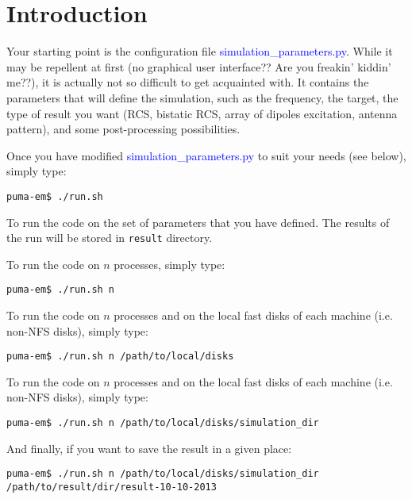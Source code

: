 \documentclass[a4paper,10pt]{book}
\newcommand{\file}[1] {\textcolor{blue}{\textsf{#1}}}
\begin{document}
\section{Introduction}
%
\par
Your starting point is the configuration file \file{simulation\_parameters.py}. While it may be repellent at first (no graphical user interface?? Are you freakin' kiddin' me??), it is actually not so difficult to get acquainted with. It contains the parameters that will define the simulation, such as the frequency, the target, the type of result you want (RCS, bistatic RCS, array of dipoles excitation, antenna pattern), and some post-processing possibilities. 
%
\par
Once you have modified \file{simulation\_parameters.py} to suit your needs (see below), simply type:
\begin{verbatim}
puma-em$ ./run.sh
\end{verbatim}
To run the code on the set of parameters that you have defined. The results of the run will be stored in \texttt{result} directory.
%
\par
To run the code on $n$ processes, simply type:
\begin{verbatim}
puma-em$ ./run.sh n
\end{verbatim}
%
\par
To run the code on $n$ processes and on the local fast disks of each machine (i.e. non-NFS disks), simply type:
\begin{verbatim}
puma-em$ ./run.sh n /path/to/local/disks
\end{verbatim}
%
\par
To run the code on $n$ processes and on the local fast disks of each machine (i.e. non-NFS disks), simply type:
\begin{verbatim}
puma-em$ ./run.sh n /path/to/local/disks/simulation_dir
\end{verbatim}
%
\par
And finally, if you want to save the result in a given place:
\begin{verbatim}
puma-em$ ./run.sh n /path/to/local/disks/simulation_dir /path/to/result/dir/result-10-10-2013
\end{verbatim}
\end{document}

